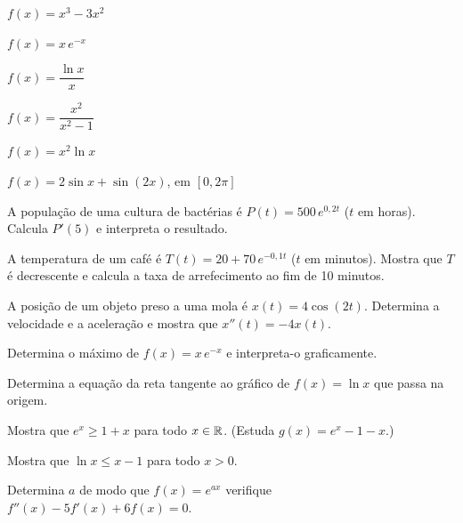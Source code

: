 \documentclass[12pt]{article}
\begin{document}
\begin{exercicios}
  \item $f(x) = x^3 - 3x^2$
  \item $f(x) = x\,e^{-x}$
  \item $f(x) = \dfrac{\ln x}{x}$
  \item $f(x) = \dfrac{x^2}{x^2 - 1}$
  \item $f(x) = x^2 \ln x$
  \item $f(x) = 2\sin x + \sin(2x)$, \; em $[0, 2\pi]$
\end{exercicios}

\begin{exercicios}
  \item A população de uma cultura de bactérias é $P(t) = 500\,e^{0{,}2t}$ ($t$ em horas). Calcula $P'(5)$ e interpreta o resultado.
  \item A temperatura de um café é $T(t) = 20 + 70\,e^{-0{,}1t}$ ($t$ em minutos). Mostra que $T$ é decrescente e calcula a taxa de arrefecimento ao fim de 10 minutos.
  \item A posição de um objeto preso a uma mola é $x(t) = 4\cos(2t)$. Determina a velocidade e a aceleração e mostra que $x''(t) = -4x(t)$.
  \item Determina o máximo de $f(x) = x\,e^{-x}$ e interpreta-o graficamente.
\end{exercicios}

\begin{exercicios}
  \item Determina a equação da reta tangente ao gráfico de $f(x) = \ln x$ que passa na origem.
  \item Mostra que $e^x \ge 1 + x$ para todo $x \in \mathbb{R}$. (Estuda $g(x) = e^x - 1 - x$.)
  \item Mostra que $\ln x \le x - 1$ para todo $x > 0$.
  \item Determina $a$ de modo que $f(x) = e^{ax}$ verifique $f''(x) - 5f'(x) + 6f(x) = 0$.
\end{exercicios}
\end{document}
